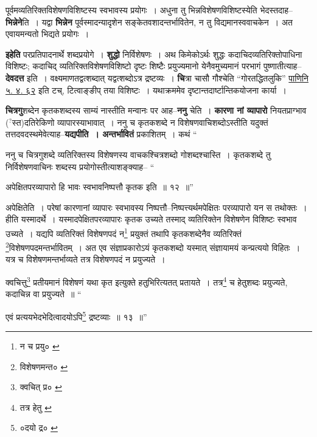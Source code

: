 \documentclass[article,12pt,a4paper]{memoir}
\newcommand{\unclear}[1]{($^{?}$#1)}
\begin{document}
	  \pstart पूर्वमव्यतिरिक्तविशेषणविशिष्टस्य स्वभावस्य प्रयोगः । अधुना तु भिन्नविशेषणविशिष्टस्येति भेदस्तदाह--\textbf{भिन्नेने}ति । यद्वा \textbf{भिन्नेन} पूर्वस्मादन्यादृशेन सङ्केतवशादन्तर्भावितेन, न तु विद्यमानस्ववाचकेन । अत एवायमन्यतो भिद्यते प्रयोगः ।
	\pend
      

	  \pstart \textbf{इहेति} परप्रतिपादनार्थे शब्दप्रयोगे । \textbf{शुद्धो} निर्विशेषणः । अथ किमेकोऽर्थः शुद्धः कदाचिदव्यतिरिक्तोपाधिना विशिष्टः; कदाचिद् व्यतिरिक्तविशेषणविशिष्टो दृष्टः शिष्टैः प्रयुज्यमानो येनैवमुच्यमानं परभागं पुष्णातीत्याह--\textbf{देवदत्त} इति । वक्ष्यमाणतद्वत्शब्दात् यद्वत्शब्दोऽत्र द्रष्टव्यः । \textbf{चि}त्रा चासौ गौश्चेति “गोरतद्धितलुकि” \href{http://http://sarit.indology.info/?cref=Pā.5.4.92}{पाणिनि ५. ४. ६२} इति टच्, टित्वाङ्ङीप् तया विशिष्टः । यथाक्रममेव दृष्टान्तदार्ष्टान्तिकयोजना कार्या ।
	\pend
      

	  \pstart \textbf{चित्रगु}शब्देन कृतकशब्दस्य साम्यं नास्तीति मन्वानः पर आह--\textbf{ननु} चेति । \textbf{कारणा नां व्यापारो} नियतप्राग्भाव \unclear{स्त}दतिरेकिणो व्यापारस्याभावात् । ननु च कृतकशब्दे न विशेषणवाचिशब्दोऽस्तीति यदुक्तं तत्तदवदस्थमेवेत्याह--\textbf{यद्यपीति । अन्तर्भावितं} प्रकाशितम् । कथं  \leavevmode{} “
	  
	ननु च चित्रगुशब्दे व्यतिरिक्तस्य विशेषणस्य वाचकश्चित्रशब्दो गोशब्दश्चास्ति । कृतकशब्दे तु निर्विशेषणवाचिनः शब्दस्य प्रयोगोस्तीत्याशङ्क्याह-- “
	  
	अपेक्षितपरव्यापारो हि भावः स्वभावनिष्पत्तौ कृतक इति ॥ १२ ॥” 
	  
	अपेक्षितेति । परेषां कारणानां व्यापारः स्वभावस्य निष्पत्तौ--निष्पत्त्यर्थमपेक्षितः परव्यापारो यन स तथोक्तः । हीति यस्मादर्थे । यस्मादपेक्षितपरव्यापारः कृतक उच्यते तस्माद् व्यतिरिक्तेन विशेषणेन विशिष्टः स्वभाव उच्यते । यद्यपि व्यतिरिक्तं विशेषणपदं न\footnote{न च प्रयु० \cite{dp-msB}} प्रयुक्तं तथापि कृतकशब्देनैव व्यतिरिक्तं \footnote{विशेषणमन्त० \cite{dp-msA} \cite{dp-edP} \cite{dp-edH} \cite{dp-edN}}\-विशेषणपदमन्तर्भावितम् । अत एव संज्ञाप्रकारोऽयं कृतकशब्दो यस्मात् संज्ञायामयं कन्प्रत्ययो विहितः । यत्र च विशेषणमन्तर्भाव्यते तत्र विशेषणपदं न प्रयुज्यते । 
	  
	क्वचित्तु\footnote{क्वचित् प्र० \cite{dp-msA} \cite{dp-msB} \cite{dp-edP} \cite{dp-edH} \cite{dp-edE} \cite{dp-edN}} प्रतीयमानं विशेषणं यथा कृत इत्युक्ते हतुभिरित्यतत् प्रतायते । तत्र\footnote{तत्र हेतु \cite{dp-msB}} च हेतुशब्दः प्रयुज्यते, कदाचिन्न वा प्रयुज्यते ॥ “
	  
	एवं प्रत्ययभेदभेदित्वादयोऽपि\footnote{०दयो द्र० \cite{dp-msB} \cite{dp-edP} \cite{dp-edH} \cite{dp-edE} \cite{dp-edN}} द्रष्टव्याः ॥ १३ ॥” 
	  
\end{document}
